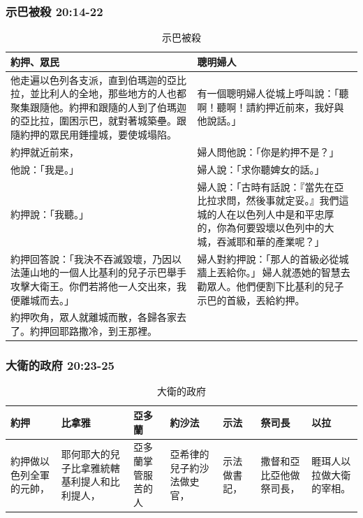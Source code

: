 \subsubsection{示巴被殺 20:14-22}
\begin{table}[H]
\hspace*{-7mm}
\centering 
\begin{tabular}{p{8.5cm}|p{8.3cm}}\hline\hline
約押、眾民&聰明婦人\\\hline
他走遍以色列各支派，直到伯瑪迦的亞比拉，並比利人的全地，那些地方的人也都聚集跟隨他。約押和跟隨的人到了伯瑪迦的亞比拉，圍困示巴，就對著城築壘。跟隨約押的眾民用錘撞城，要使城塌陷。
&有一個聰明婦人從城上呼叫說：「聽啊！聽啊！請約押近前來，我好與他說話。」\\\hline
約押就近前來，&婦人問他說：「你是約押不是？」\\\hline
他說：「我是。」&婦人說：「求你聽婢女的話。」\\\hline
約押說：「我聽。」&婦人說：「古時有話說：『當先在亞比拉求問，然後事就定妥。』我們這城的人在以色列人中是和平忠厚的，你為何要毀壞以色列中的大城，吞滅耶和華的產業呢？」\\\hline
約押回答說：「我決不吞滅毀壞，乃因以法蓮山地的一個人比基利的兒子示巴舉手攻擊大衛王。你們若將他一人交出來，我便離城而去。」&婦人對約押說：「那人的首級必從城牆上丟給你。」 婦人就憑她的智慧去勸眾人。他們便割下比基利的兒子示巴的首級，丟給約押。\\\hline
約押吹角，眾人就離城而散，各歸各家去了。約押回耶路撒冷，到王那裡。&\\\hline
\end{tabular}
\caption{示巴被殺}
\end{table}


\subsubsection{大衛的政府 20:23-25}
\begin{table}[H]
\hspace*{-12mm}
\centering 
\begin{tabular}{p{2.25cm}|p{4cm}|p{1.9cm}|p{2.25cm}|p{1.25cm}|p{2.25cm}|p{2.25cm}}\hline\hline
約押&比拿雅&亞多蘭&約沙法&示法&祭司長&以拉\\\hline
約押做以色列全軍的元帥，
&耶何耶大的兒子比拿雅統轄基利提人和比利提人，
&亞多蘭掌管服苦的人
&亞希律的兒子約沙法做史官， 
&示法做書記，
&撒督和亞比亞他做祭司長，
&睚珥人以拉做大衛的宰相。\\\hline
\end{tabular}
\caption{大衛的政府}
\end{table}



